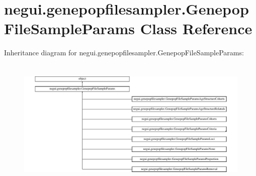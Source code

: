 \hypertarget{classnegui_1_1genepopfilesampler_1_1GenepopFileSampleParams}{}\section{negui.\+genepopfilesampler.\+Genepop\+File\+Sample\+Params Class Reference}
\label{classnegui_1_1genepopfilesampler_1_1GenepopFileSampleParams}
Inheritance diagram for negui.\+genepopfilesampler.\+Genepop\+File\+Sample\+Params\+:\begin{figure}[H]
\begin{center}
\leavevmode
\includegraphics[height=6.263982cm]{classnegui_1_1genepopfilesampler_1_1GenepopFileSampleParams}
\end{center}
\end{figure}
